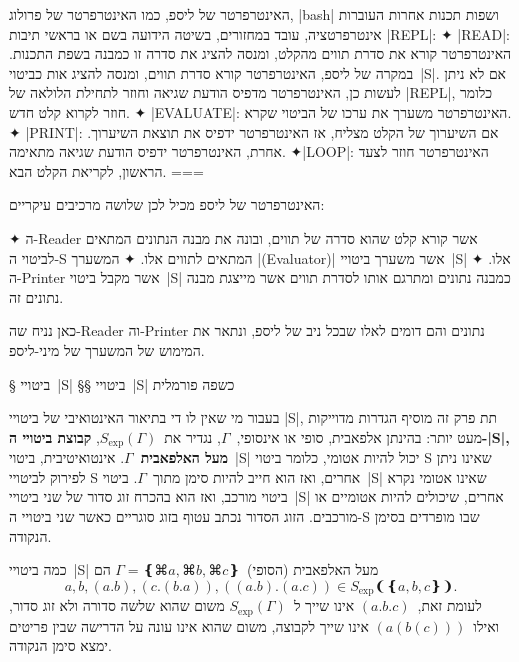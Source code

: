 \begin{minipage}\linewidth
  \footnotesize
  \begin{mdframed}[backgroundcolor=Lavender!20]
    האינטרפרטר של ליספ, כמו האינטרפרטר של פרולוג, \E|bash| ושפות תכנות אחרות
    העוברות אינטרפרטציה, עובד במחזורים, בשיטה הידועה בשם
    או בראשי תיבות \E|REPL|:
    ✦ \E|READ|: האינטרפרטר קורא את סדרת תווים מהקלט, ומנסה להציג את סדרה זו
    כמבנה בשפת התכנות. במקרה של ליספ, האינטרפרטר קורא סדרת תווים, ומנסה להציג
    אות כביטוי~\E|S|. אם לא ניתן לעשות כן, האינטרפרטר מדפיס הודעת שגיאה וחוזר
    לתחילת הלולאה של \E|REPL|, כלומר חוזר לקרוא קלט חדש.
    ✦ \E|EVALUATE|: האינטרפרטר משערך את ערכו של הביטוי שקרא.
    ✦ \E|PRINT|: אם השיערוך של הקלט מצליח, אז האינטרפרטר ידפיס את תוצאת
    השיערוך. אחרת, האינטרפרטר ידפיס הודעת שגיאה מתאימה.
    ✦\E|LOOP|: האינטרפרטר חוזר לצעד הראשון, לקריאת הקלט הבא.
===
  \end{mdframed}
\end{minipage}

האינטרפרטר של ליספ מכיל לכן שלושה מרכיבים עיקריים:
\begin{enumerate}
  ✦ ה-Reader אשר קורא קלט שהוא סדרה של תווים, ובונה את מבנה הנתונים המתאים
  לביטוי ה-S המתאים לתווים אלו.
  ✦ המשערך \E|(Evaluator)| אשר משערך ביטויי~\E|S| אלו.
  ✦ ה-Printer אשר מקבל ביטוי~\E|S| כמבנה נתונים ומתרגם אותו לסדרת תווים אשר
  מייצגת מבנה נתונים זה.
\end{enumerate}

כאן נניח שה-Reader וה-Printer נתונים והם דומים לאלו שבכל ניב של ליספ, ונתאר את
המימוש של המשערך של מיני-ליספ.

§ ביטויי~\E|S|
§§ ביטויי~\E|S| כשפה פורמלית

\newcommand\SX{\ensuremath{S_{\text{exp}}}}

בעבור מי שאין לו די בתיאור האינטואיבי של ביטויי \E|S|, תת פרק זה מוסיף הגדרות
מדוייקות מעט יותר: בהינתן אלפאבית, סופי או אינסופי,~$Γ$, נגדיר את~$\SX(Γ)$,
\textbf{קבוצת ביטויי ה-\E|S|, מעל האלפאבית~$Γ$}. אינטואיטיבית, ביטוי~\E|S| יכול
להיות אטומי, כלומר ביטוי S שאינו ניתן לפירוק לביטויי S אחרים, ואז הוא חייב
להיות סימן מתוך~$Γ$. ביטוי~\E|S| שאינו אטומי נקרא ביטוי מורכב, ואז הוא בהכרח
זוג סדור של שני ביטויי~\E|S| אחרים, שיכולים להיות אטומיים או מורכבים. הזוג
הסדור נכתב עטוף בזוג סוגריים כאשר שני ביטויי ה-S שבו מופרדים בסימן הנקודה.

כמה ביטויי~\E|S| מעל האלפאבית (הסופי)~$Γ=❴⌘a,⌘b,⌘c❵$ הם \[
  a,b,(a.b),(c.(b.a)),((a.b).(a.c))∈\SX❨❴a,b,c❵❩.
\] לעומת זאת,~$(a.b.c)$ אינו שייך ל~$\SX(Γ)$ משום שהוא שלשה סדורה ולא זוג סדור,
ואילו~$(a(b(c)))$ אינו שייך לקבוצה, משום שהוא אינו עונה על הדרישה שבין פריטים
ימצא סימן הנקודה.

